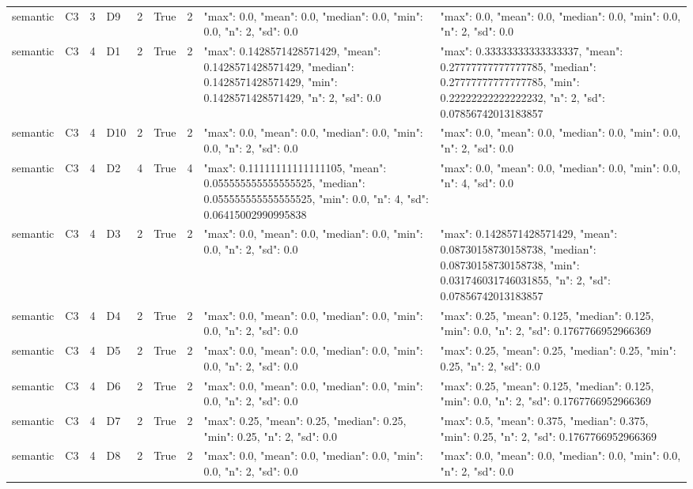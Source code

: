 \begin{tabular}{lllllllll}
semantic & C3 & 3 & D9 & 2 & True & 2 & {"max": 0.0, "mean": 0.0, "median": 0.0, "min": 0.0, "n": 2, "sd": 0.0} & {"max": 0.0, "mean": 0.0, "median": 0.0, "min": 0.0, "n": 2, "sd": 0.0} \\
semantic & C3 & 4 & D1 & 2 & True & 2 & {"max": 0.1428571428571429, "mean": 0.1428571428571429, "median": 0.1428571428571429, "min": 0.1428571428571429, "n": 2, "sd": 0.0} & {"max": 0.33333333333333337, "mean": 0.27777777777777785, "median": 0.27777777777777785, "min": 0.22222222222222232, "n": 2, "sd": 0.07856742013183857} \\
semantic & C3 & 4 & D10 & 2 & True & 2 & {"max": 0.0, "mean": 0.0, "median": 0.0, "min": 0.0, "n": 2, "sd": 0.0} & {"max": 0.0, "mean": 0.0, "median": 0.0, "min": 0.0, "n": 2, "sd": 0.0} \\
semantic & C3 & 4 & D2 & 4 & True & 4 & {"max": 0.11111111111111105, "mean": 0.055555555555555525, "median": 0.055555555555555525, "min": 0.0, "n": 4, "sd": 0.06415002990995838} & {"max": 0.0, "mean": 0.0, "median": 0.0, "min": 0.0, "n": 4, "sd": 0.0} \\
semantic & C3 & 4 & D3 & 2 & True & 2 & {"max": 0.0, "mean": 0.0, "median": 0.0, "min": 0.0, "n": 2, "sd": 0.0} & {"max": 0.1428571428571429, "mean": 0.08730158730158738, "median": 0.08730158730158738, "min": 0.031746031746031855, "n": 2, "sd": 0.07856742013183857} \\
semantic & C3 & 4 & D4 & 2 & True & 2 & {"max": 0.0, "mean": 0.0, "median": 0.0, "min": 0.0, "n": 2, "sd": 0.0} & {"max": 0.25, "mean": 0.125, "median": 0.125, "min": 0.0, "n": 2, "sd": 0.1767766952966369} \\
semantic & C3 & 4 & D5 & 2 & True & 2 & {"max": 0.0, "mean": 0.0, "median": 0.0, "min": 0.0, "n": 2, "sd": 0.0} & {"max": 0.25, "mean": 0.25, "median": 0.25, "min": 0.25, "n": 2, "sd": 0.0} \\
semantic & C3 & 4 & D6 & 2 & True & 2 & {"max": 0.0, "mean": 0.0, "median": 0.0, "min": 0.0, "n": 2, "sd": 0.0} & {"max": 0.25, "mean": 0.125, "median": 0.125, "min": 0.0, "n": 2, "sd": 0.1767766952966369} \\
semantic & C3 & 4 & D7 & 2 & True & 2 & {"max": 0.25, "mean": 0.25, "median": 0.25, "min": 0.25, "n": 2, "sd": 0.0} & {"max": 0.5, "mean": 0.375, "median": 0.375, "min": 0.25, "n": 2, "sd": 0.1767766952966369} \\
semantic & C3 & 4 & D8 & 2 & True & 2 & {"max": 0.0, "mean": 0.0, "median": 0.0, "min": 0.0, "n": 2, "sd": 0.0} & {"max": 0.0, "mean": 0.0, "median": 0.0, "min": 0.0, "n": 2, "sd": 0.0} \\

\end{tabular}
